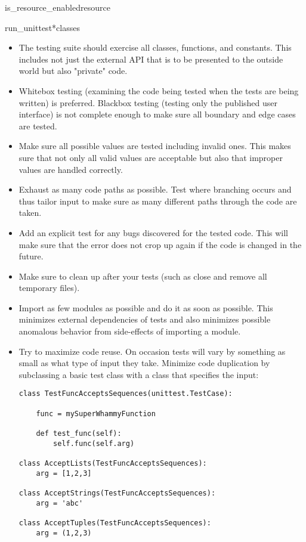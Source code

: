 \begin{funcdesc}{is_resource_enabled}{resource}
\begin{funcdesc}{run_unittest}{*classes}
\begin{itemize}
\item The testing suite should exercise all classes, functions, and
      constants.
      This includes not just the external API that is to be presented to the
      outside world but also "private" code.
\item Whitebox testing (examining the code being tested when the tests are
      being written) is preferred.
      Blackbox testing (testing only the published user interface) is not
      complete enough to make sure all boundary and edge cases are tested.
\item Make sure all possible values are tested including invalid ones.
      This makes sure that not only all valid values are acceptable but also
      that improper values are handled correctly.
\item Exhaust as many code paths as possible.
      Test where branching occurs and thus tailor input to make sure as many
      different paths through the code are taken.
\item Add an explicit test for any bugs discovered for the tested code.
      This will make sure that the error does not crop up again if the code is
      changed in the future.
\item Make sure to clean up after your tests (such as close and remove all
      temporary files).
\item Import as few modules as possible and do it as soon as possible.
      This minimizes external dependencies of tests and also minimizes possible
      anomalous behavior from side-effects of importing a module.
\item Try to maximize code reuse.
      On occasion tests will vary by something as small as what type of input
      they take.
      Minimize code duplication by subclassing a basic test class with a class
      that specifies the input:
\begin{verbatim}
class TestFuncAcceptsSequences(unittest.TestCase):

    func = mySuperWhammyFunction

    def test_func(self):
        self.func(self.arg)

class AcceptLists(TestFuncAcceptsSequences):
    arg = [1,2,3]

class AcceptStrings(TestFuncAcceptsSequences):
    arg = 'abc'

class AcceptTuples(TestFuncAcceptsSequences):
    arg = (1,2,3)
\end{verbatim}
\end{itemize}


\end{funcdesc}
\end{funcdesc}
